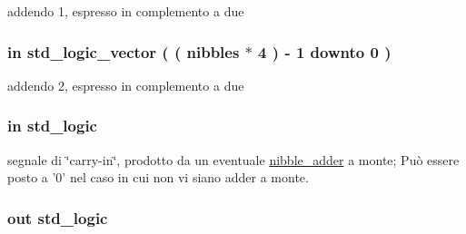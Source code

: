 addendo 1, espresso in complemento a due 

\hypertarget{group___carry_loockahead_ga2715463c615cf8418f85c6a1427ce62c}{
\subsubsection[{addendum2}]{ {\bfseries \textcolor{vhdlchar}{in}\textcolor{vhdlchar}{ }} {\bfseries \textcolor{vhdlchar}{std\+\_\+logic\+\_\+vector}\textcolor{vhdlchar}{ }\textcolor{vhdlchar}{(}\textcolor{vhdlchar}{ }\textcolor{vhdlchar}{(}\textcolor{vhdlchar}{ }\textcolor{vhdlchar}{ }\textcolor{vhdlchar}{ }\textcolor{vhdlchar}{ }{\bfseries {\bf nibbles}} \textcolor{vhdlchar}{$\ast$}\textcolor{vhdlchar}{ } \textcolor{vhdldigit}{4} \textcolor{vhdlchar}{ }\textcolor{vhdlchar}{)}\textcolor{vhdlchar}{ }\textcolor{vhdlchar}{-\/}\textcolor{vhdlchar}{ } \textcolor{vhdldigit}{1} \textcolor{vhdlchar}{ }\textcolor{vhdlchar}{downto}\textcolor{vhdlchar}{ }\textcolor{vhdlchar}{ } \textcolor{vhdldigit}{0} \textcolor{vhdlchar}{ }\textcolor{vhdlchar}{)}\textcolor{vhdlchar}{ }} \hspace{0.3cm}{\ttfamily [Port]}}}\label{group___carry_loockahead_ga2715463c615cf8418f85c6a1427ce62c}


addendo 2, espresso in complemento a due 

\hypertarget{group___carry_loockahead_ga1c211cdf2d4cf97e869c442832c53439}{
\subsubsection[{carry\+\_\+in}]{ {\bfseries \textcolor{vhdlchar}{in}\textcolor{vhdlchar}{ }} {\bfseries \textcolor{vhdlchar}{std\+\_\+logic}\textcolor{vhdlchar}{ }} \hspace{0.3cm}{\ttfamily [Port]}}}\label{group___carry_loockahead_ga1c211cdf2d4cf97e869c442832c53439}


segnale di \char`\"{}carry-\/in\char`\"{}, prodotto da un eventuale \hyperlink{classnibble__adder}{nibble\+\_\+adder} a monte; Può essere posto a '0' nel caso in cui non vi siano adder a monte. 

\hypertarget{group___carry_loockahead_ga851aaea297bdc862fba5478c4bf0e214}{
\subsubsection[{carry\+\_\+out}]{ {\bfseries \textcolor{vhdlchar}{out}\textcolor{vhdlchar}{ }} {\bfseries \textcolor{vhdlchar}{std\+\_\+logic}\textcolor{vhdlchar}{ }} \hspace{0.3cm}{\ttfamily [Port]}}}\label{group___carry_loockahead_ga851aaea297bdc862fba5478c4bf0e214}


